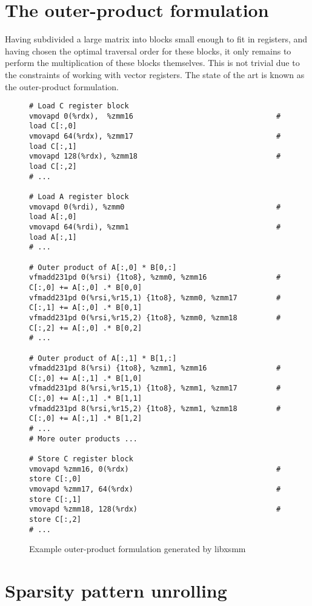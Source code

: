 \section{The outer-product formulation}

Having subdivided a large matrix into blocks small enough to fit in registers, and having chosen the optimal traversal order for these blocks, it only remains to perform the multiplication of these blocks themselves. This is not trivial due to the constraints of working with vector registers. The state of the art is known as the outer-product formulation.

\begin{figure}[ht]
\begin{verbatim}
# Load C register block
vmovapd 0(%rdx),  %zmm16                                 # load C[:,0]
vmovapd 64(%rdx), %zmm17                                 # load C[:,1]
vmovapd 128(%rdx), %zmm18                                # load C[:,2]
# ...

# Load A register block
vmovapd 0(%rdi), %zmm0                                   # load A[:,0]
vmovapd 64(%rdi), %zmm1                                  # load A[:,1]
# ...

# Outer product of A[:,0] * B[0,:]
vfmadd231pd 0(%rsi) {1to8}, %zmm0, %zmm16                # C[:,0] += A[:,0] .* B[0,0]
vfmadd231pd 0(%rsi,%r15,1) {1to8}, %zmm0, %zmm17         # C[:,1] += A[:,0] .* B[0,1]
vfmadd231pd 0(%rsi,%r15,2) {1to8}, %zmm0, %zmm18         # C[:,2] += A[:,0] .* B[0,2]
# ...

# Outer product of A[:,1] * B[1,:]
vfmadd231pd 8(%rsi) {1to8}, %zmm1, %zmm16                # C[:,0] += A[:,1] .* B[1,0]
vfmadd231pd 8(%rsi,%r15,1) {1to8}, %zmm1, %zmm17         # C[:,0] += A[:,1] .* B[1,1]
vfmadd231pd 8(%rsi,%r15,2) {1to8}, %zmm1, %zmm18         # C[:,0] += A[:,1] .* B[1,2]
# ...
# More outer products ...

# Store C register block
vmovapd %zmm16, 0(%rdx)                                  # store C[:,0]
vmovapd %zmm17, 64(%rdx)                                 # store C[:,1]
vmovapd %zmm18, 128(%rdx)                                # store C[:,2]
# ...
\end{verbatim}
\caption{Example outer-product formulation generated by libxsmm}
\label{fig:outerproduct}
\end{figure}

\section{Sparsity pattern unrolling}

